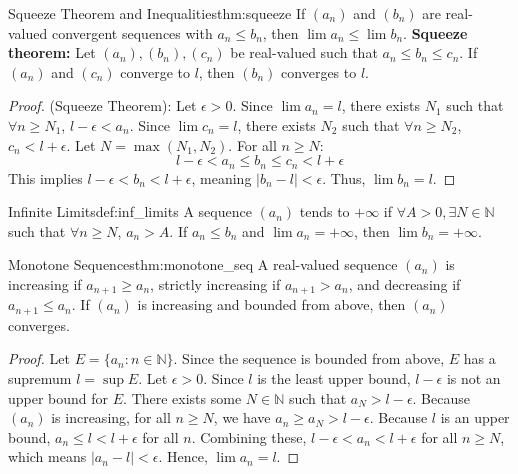 \documentclass[11pt, a4paper]{article}
\begin{document}
\begin{theorem}{Squeeze Theorem and Inequalities}{thm:squeeze}
If $(a_n)$ and $(b_n)$ are real-valued convergent sequences with $a_n \le b_n$, then $\lim a_n \le \lim b_n$. 
\textbf{Squeeze theorem:} Let $(a_n), (b_n), (c_n)$ be real-valued such that $a_n \le b_n \le c_n$. If $(a_n)$ and $(c_n)$ converge to $l$, then $(b_n)$ converges to $l$.
\end{theorem}
\begin{proof}
(Squeeze Theorem): Let $\epsilon > 0$. Since $\lim a_n = l$, there exists $N_1$ such that $\forall n \ge N_1$, $l - \epsilon < a_n$.
Since $\lim c_n = l$, there exists $N_2$ such that $\forall n \ge N_2$, $c_n < l + \epsilon$.
Let $N = \max(N_1, N_2)$. For all $n \ge N$:
$$ l - \epsilon < a_n \le b_n \le c_n < l + \epsilon $$
This implies $l - \epsilon < b_n < l + \epsilon$, meaning $|b_n - l| < \epsilon$. Thus, $\lim b_n = l$.
\end{proof}

\begin{definition}{Infinite Limits}{def:inf_limits}
A sequence $(a_n)$ tends to $+\infty$ if $\forall A > 0, \exists N \in \mathbb{N}$ such that $\forall n \ge N$, $a_n > A$. If $a_n \le b_n$ and $\lim a_n = +\infty$, then $\lim b_n = +\infty$.
\end{definition}

\begin{theorem}{Monotone Sequences}{thm:monotone_seq}
A real-valued sequence $(a_n)$ is increasing if $a_{n+1} \ge a_n$, strictly increasing if $a_{n+1} > a_n$, and decreasing if $a_{n+1} \le a_n$. 
If $(a_n)$ is increasing and bounded from above, then $(a_n)$ converges.
\end{theorem}
\begin{proof}
Let $E = \{a_n : n \in \mathbb{N}\}$. Since the sequence is bounded from above, $E$ has a supremum $l = \sup E$.
Let $\epsilon > 0$. Since $l$ is the least upper bound, $l - \epsilon$ is not an upper bound for $E$.
There exists some $N \in \mathbb{N}$ such that $a_N > l - \epsilon$.
Because $(a_n)$ is increasing, for all $n \ge N$, we have $a_n \ge a_N > l - \epsilon$.
Because $l$ is an upper bound, $a_n \le l < l + \epsilon$ for all $n$.
Combining these, $l - \epsilon < a_n < l + \epsilon$ for all $n \ge N$, which means $|a_n - l| < \epsilon$. Hence, $\lim a_n = l$.
\end{proof}
\end{document}
